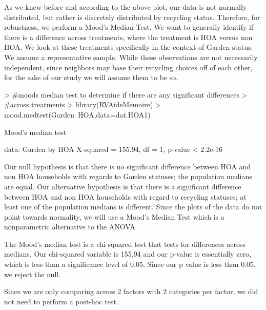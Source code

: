 \documentclass{article}
\begin{document}
As we knew before and according to the above plot, our data is not normally distributed, but rather is discretely distributed by recycling status. Therefore, for robustness, we perform a Mood's Median Test. We want to generally identify if there is a difference across treatments, where the treatment is HOA versus non HOA. We look at these treatments specifically in the context of Garden status. We assume a representative sample. While these observations are not necessarily independent, since neighbors may base their recycling choices off of each other, for the sake of our study we will assume them to be so.

\begin{Schunk}
\begin{Sinput}
> #moods median test to determine if there are any significant differences
> #across treatments
> library(RVAideMemoire)
> mood.medtest(Garden~HOA,data=dat.HOA1)
\end{Sinput}
\begin{Soutput}
	Mood's median test

data:  Garden by HOA
X-squared = 155.94, df = 1, p-value < 2.2e-16
\end{Soutput}
\end{Schunk}

Our null hypothesis is that there is no significant difference between HOA and non HOA households with regards to Garden statuses; the population medians are equal. Our alternative hypothesis is that there is a significant difference between HOA and non HOA households with regard to recycling statuses; at least one of the population medians is different. Since the plots of the data do not point towards normality, we will use a Mood's Median Test which is a nonparametric alternative to the ANOVA.

The Mood's median test is a chi-squared test that tests for differences across medians. Our chi-squared variable is 155.94 and our p-value is essentially zero, which is less than a significance level of 0.05. Since our p value is less than 0.05, we reject the null. 

Since we are only comparing across 2 factors with 2 categories per factor, we did not need to perform a post-hoc test. 
\end{document}
